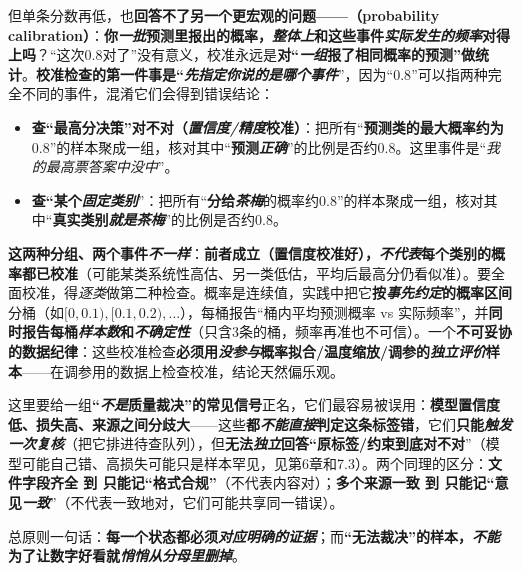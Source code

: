 但单条分数再低，也\textbf{回答不了另一个更宏观的问题——（probability calibration）}：\textbf{你\emph{一批}预测里报出的概率，\emph{整体上}和这些事件\emph{实际发生的频率}对得上吗}？“这次$0.8$对了”没有意义，校准永远是\textbf{对“\emph{一组}报了相同概率的预测”做统计}。\textbf{校准检查的第一件事是“\emph{先指定你说的是哪个事件}}”，因为“$0.8$”可以指两种完全不同的事件，混淆它们会得到错误结论：
\begin{itemize}\item \textbf{查“最高分决策”对不对（\emph{置信度/精度}校准）}：把所有“\textbf{预测类的最大概率约为$0.8$}”的样本聚成一组，核对其中“\textbf{预测\emph{正确}}”的比例是否约$0.8$。这里事件是“\emph{我的最高票答案中没中}”。\item \textbf{查“某个\emph{固定类别}}”：把所有“\textbf{分给\emph{茶梅}}的概率约$0.8$”的样本聚成一组，核对其中“\textbf{真实类别\emph{就是茶梅}}”的比例是否约$0.8$。\end{itemize}
\textbf{这两种分组、两个事件\emph{不一样}}：\textbf{前者成立（置信度校准好），\emph{不代表}每个类别的概率都已校准}（可能某类系统性高估、另一类低估，平均后最高分仍看似准）。要全面校准，得\emph{逐类}做第二种检查。概率是连续值，实践中把它\textbf{按\emph{事先约定}的概率区间}分桶（如$[0,0.1),[0.1,0.2),\ldots$），每桶报告“桶内平均预测概率 vs 实际频率”，并\textbf{同时报告每桶\emph{样本数}和\emph{不确定性}}（只含3条的桶，频率再准也不可信）。一个\textbf{不可妥协的数据纪律}：这些校准检查\textbf{必须用\emph{没参与}概率拟合/温度缩放/调参的\emph{独立评价}样本}——在调参用的数据上检查校准，结论天然偏乐观。

这里要给一组\textbf{“\emph{不是}质量裁决”的常见信号}正名，它们最容易被误用：\textbf{模型置信度低、损失高、来源之间分歧大}——这些\textbf{都\emph{不能直接}判定这条标签错}，它们\textbf{只能\emph{触发一次复核}}（把它排进待查队列），但\textbf{无法\emph{独立}回答“原标签/约束到底对不对}”（模型可能自己错、高损失可能只是样本罕见，见第6章和7.3）。两个同理的区分：\textbf{文件字段齐全 到 只能记“格式合规”}（不代表内容对）；\textbf{多个来源一致 到 只能记“意见\emph{一致}}”（不代表一致地对，它们可能共享同一错误）。

总原则一句话：\textbf{每一个状态都必须\emph{对应明确的证据}}；而\textbf{“无法裁决”的样本，\emph{不能}为了让数字好看就\emph{悄悄从分母里删掉}}。

